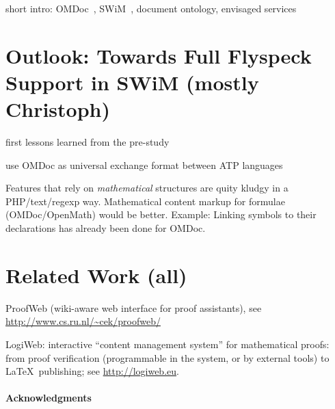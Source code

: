 \documentclass{llncs}
\begin{document}
short intro: OMDoc~\cite{Kohlhase:omdoc1.2}, SWiM~\cite{Lange:swmkm-tr07}, document
ontology, envisaged services

\section{Outlook: Towards Full Flyspeck Support in SWiM (mostly Christoph)}
\label{sec:flyspeck-swim}

first lessons learned from the pre-study

use OMDoc as universal exchange format between ATP languages

Features that rely on \emph{mathematical} structures are quity kludgy in a PHP/text/regexp
way.  Mathematical content markup for formulae (OMDoc/OpenMath) would be better.  Example:
Linking symbols to their declarations has already been done for OMDoc.


\section{Related Work (all)}
\label{sec:related}

ProofWeb (wiki-aware web interface for proof assistants), see
\url{http://www.cs.ru.nl/~cek/proofweb/}

LogiWeb: interactive ``content management system'' for mathematical proofs: from proof
verification (programmable in the system, or by external tools) to \LaTeX\ publishing; see
\url{http://logiweb.eu}.

\paragraph{Acknowledgments}
\label{sec:ack}





\ednotemessage
\end{document}
